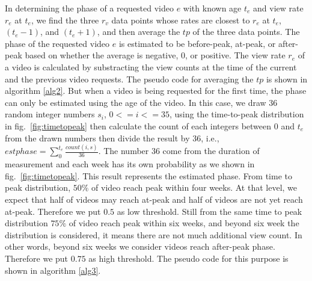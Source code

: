 In determining the phase of a requested video $e$ with known age $t_e$ and view rate $r_e$ at $t_e$, we find the three $r_v$ data points whose rates are closest to $r_e$ at $t_e$, $(t_e - 1)$, and $(t_e + 1)$, and then average the $tp$ of the three data points.
The phase of the requested video $e$ is estimated to be before-peak, at-peak, or after-peak based on whether the average is negative, $0$, or positive.
The view rate $r_e$ of a video is calculated by substracting the view counts at the time of the current and the previous video requests.
The pseudo code for averaging the $tp$ is shown in algorithm \ref{alg2}.
But when a video is being requested for the first time, the phase can only be estimated using the age of the video.
In this case, we draw 36 random integer numbers $s_i$, $0 <= i <= 35$,  using the time-to-peak distribution in fig.~\ref{fig:timetopeak} then calculate the count of each integers between $0$ and $t_e$ from the drawn numbers then divide the result by 36, 
i.e., $estphase = \sum_{0}^{t_e} \frac{count(i,s)}{36}$.
The number 36 come from the duration of measurement and each week has its own probability as we shown in fig.~\ref{fig:timetopeak}.
This result represents the estimated phase. 
From time to peak distribution, $50\%$ of video reach peak within four weeks. 
At that level, we expect that half of videos may reach at-peak and half of videos are not yet reach at-peak.
Therefore we put $0.5$ as low threshold.  
Still from the same time to peak distribution $75\%$ of video reach peak within six weeks, and beyond six week the distribution is considered, it means there are not much additional view count. 
In other words, beyond six weeks we consider videos reach after-peak phase. 
Therefore we put $0.75$ as high threshold.
The pseudo code for this purpose is shown in algorithm \ref{alg3}.


